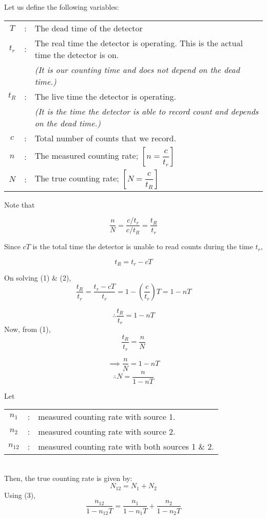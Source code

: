 \documentclass[12pt,a4paper]{article}
\begin{document}
			Let us define the following variables:
			
			\begin{tabular}{ccl}
				$T$&:& The dead time of the detector\\
				$t_r$&:& The real time the detector is operating. This is the actual time the detector is on.\\
					& &\textit{(It is our counting time and does not depend on the dead time.)}\\
				$t_{R}$&:& The live time the detector is operating.\\
				& & \textit{(It is the time the detector is able to record count and depends on the dead time.)}\\
				$c$&:& Total number of counts that we record.\\
				$n$&:& The measured counting rate; $\left[ n = \dfrac{c}{t_r} \right]$\\
				$N$&:& The true counting rate; $\left[ N = \dfrac{c}{t_R} \right]$
			\end{tabular}
			
			Note that
			
			\begin{equation}
				\dfrac{n}{N} = \dfrac{c/t_r}{c/t_R} = \dfrac{t_R}{t_r}
			\end{equation}
			
			Since $cT$ is the total time the detector is unable to read counts during the time $t_r$,
			
			\begin{equation}
				t_R = t_r - cT
			\end{equation}
			
			On solving (1) \& (2),
		\begin{dmath*}
			\dfrac{t_R}{t_r} = \dfrac{t_{r} - cT}{t_r} = 1 - \left( \dfrac{c}{t_r} \right)T = 1 - nT
		\end{dmath*}
	
	\begin{equation*}
		\therefore \dfrac{t_R}{t_r} = 1 - nT		
	\end{equation*}
	Now, from (1), $$\dfrac{t_R}{t_r}=\dfrac{n}{N}$$
	
	$$	\implies \dfrac{n}{N} = 1 - nT $$
	\begin{equation}
		\therefore N = \dfrac{n}{1 - nT}
	\end{equation}
	
	Let
	\begin{tabular}{ccl}
	$n_1$&:& measured counting rate with source 1.\\
	$n_2$&:& measured counting rate with source 2.\\
	$n_{12}$&:& measured counting rate with both sources 1 \& 2.	
	\end{tabular}
	\vspace{10pt}\\
	Then, the true counting rate is given by: 
	\begin{equation}
		N_{12} = N_1 + N_2
	\end{equation}
	Using (3),
	$$	\dfrac{n_{12}}{1-n_{12}T} = \dfrac{n_{1}}{1-n_{1}T} + \dfrac{n_{2}}{1-n_{2}T}$$
	
\end{document}
